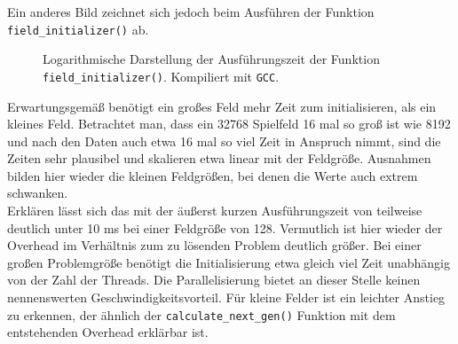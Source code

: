 \documentclass[german,plainarticle,hyperref,utf8]{zihpub}
\begin{document}
	Ein anderes Bild zeichnet sich jedoch beim Ausführen der Funktion \texttt{field\_initializer()} ab.
	\begin{figure}[h]
		\begin{center}
			
		\end{center}
		\caption{Logarithmische Darstellung der Ausführungszeit der Funktion \texttt{field\_initializer()}. Kompiliert mit \texttt{GCC}.}
	\end{figure}
	\newline
	Erwartungsgemäß benötigt ein großes Feld mehr Zeit zum initialisieren, als ein kleines Feld. Betrachtet man, dass ein 32768 Spielfeld 16 mal so groß ist wie 8192 und nach den Daten auch etwa 16 mal so viel Zeit in Anspruch nimmt, sind die Zeiten sehr plausibel und skalieren etwa linear mit der Feldgröße. Ausnahmen bilden hier wieder die kleinen Feldgrößen, bei denen die Werte auch extrem schwanken.\\
	Erklären lässt sich das mit der äußerst kurzen Ausführungszeit von teilweise deutlich unter 10 ms bei einer Feldgröße von 128. Vermutlich ist hier wieder der Overhead im Verhältnis zum zu lösenden Problem deutlich größer.
	Bei einer großen Problemgröße benötigt die Initialisierung etwa gleich viel Zeit unabhängig von der Zahl der Threads. Die Parallelisierung bietet an dieser Stelle keinen nennenswerten Geschwindigkeitsvorteil. Für kleine Felder ist ein leichter Anstieg zu erkennen, der ähnlich der \texttt{calculate\_next\_gen()} Funktion mit dem entstehenden Overhead erklärbar ist.
	\newpage
\end{document}
